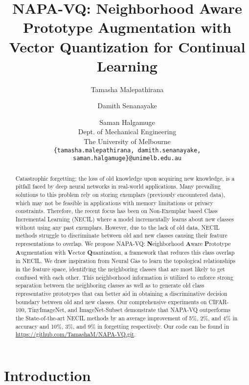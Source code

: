 \documentclass[10pt,twocolumn,letterpaper]{article}
\begin{document}
\title{NAPA-VQ: Neighborhood Aware Prototype Augmentation with Vector Quantization for Continual Learning}

\author{Tamasha Malepathirana \and Damith Senanayake \and Saman Halgamuge \\
Dept. of Mechanical Engineering\\
The University of Melbourne\\
{\tt\small \{tamasha.malepathirana, damith.senanayake, saman.halgamuge\}@unimelb.edu.au}
}
\maketitle
\ificcvfinal\thispagestyle{empty}\fi

\begin{abstract}
Catastrophic forgetting; the loss of old knowledge upon acquiring new knowledge, is a pitfall faced by deep neural networks in real-world applications. Many prevailing solutions to this problem rely on storing exemplars (previously encountered data), which may not be feasible in applications with memory limitations or privacy constraints. Therefore, the recent focus has been on Non-Exemplar based Class Incremental Learning (NECIL) where a model incrementally learns about new classes without using any past exemplars. However, due to the lack of old data, NECIL methods struggle to discriminate between old and new classes causing their feature representations to overlap. We propose NAPA-VQ: \textbf{N}eighborhood \textbf{A}ware \textbf{P}rototype \textbf{A}ugmentation with \textbf{V}ector \textbf{Q}uantization, a framework that reduces this class overlap in NECIL. We draw inspiration from Neural Gas to learn the topological relationships in the feature space, identifying the neighboring classes that are most likely to get confused with each other. This neighborhood information is utilized to enforce strong separation between the neighboring classes as well as to generate old class representative prototypes that can better aid in obtaining a  discriminative decision boundary between old and new classes. Our comprehensive experiments on CIFAR-100, TinyImageNet, and ImageNet-Subset demonstrate that NAPA-VQ outperforms the State-of-the-art NECIL methods by an average improvement of 5\%, 2\%, and 4\% in accuracy and 10\%, 3\%, and 9\% in forgetting respectively. Our code can be found in \url{https://github.com/TamashaM/NAPA-VQ.git}.
\end{abstract}



\section{Introduction}
\end{document}
